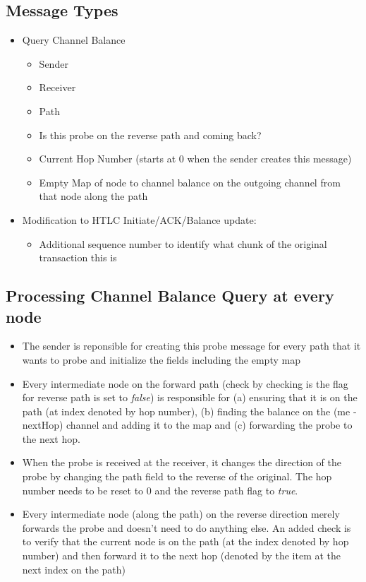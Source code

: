 \documentclass[a4paper]{article}
\begin{document}
\subsection{Message Types}
\begin{itemize}
    \item Query Channel Balance
        \begin{itemize}
            \item Sender
            \item Receiver
            \item Path 
            \item Is this probe on the reverse path and coming back?
            \item Current Hop Number (starts at 0 when the sender creates this message)
            \item Empty Map of node to channel balance on the outgoing channel from that node along the path
        \end{itemize}

    \item Modification to HTLC Initiate/ACK/Balance update:
        \begin{itemize}
            \item Additional sequence number to identify what chunk of the original transaction this is
        \end{itemize}
\end{itemize}

\subsection{Processing Channel Balance Query at every node}
\begin{itemize}
    \item The sender is reponsible for creating this probe message for every path that it wants to probe and initialize the fields including the empty map
    \item Every intermediate node on the forward path (check by checking is the flag for reverse path is set to {\em{false}}) 
        is responsible for (a) ensuring that it is on the path (at index denoted by hop number), (b) finding
        the balance on the (me - nextHop) channel and adding it to the map and (c) forwarding the probe to the next hop. 
    \item When the probe is received at the receiver, it changes the direction of the probe by changing the path field to the reverse of the original. 
        The hop number needs to be reset to $0$ and the reverse path flag to {\em{true}}.
    \item Every intermediate node (along the path) on the reverse direction merely forwards the probe and doesn't need to do anything else. An added check is to
        verify that the current node is on the path (at the index denoted by hop number) and then forward it to the next hop (denoted by the item at the next index
        on the path)
\end{itemize}
\end{document}
